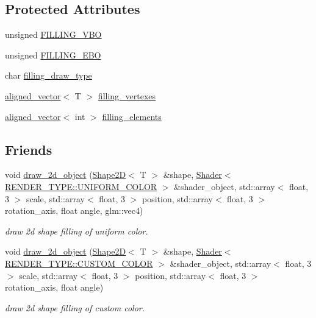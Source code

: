 \subsection*{Protected Attributes}
\begin{DoxyCompactItemize}
\item 
unsigned \mbox{\hyperlink{classShape2D_a220cf4cf96da8bd43627ffffd00a0718}{F\+I\+L\+L\+I\+N\+G\+\_\+\+V\+BO}}
\item 
unsigned \mbox{\hyperlink{classShape2D_affa1082cd6e91cce5af4cb10c1b3435f}{F\+I\+L\+L\+I\+N\+G\+\_\+\+E\+BO}}
\item 
char \mbox{\hyperlink{classShape2D_ab24ceddaa0114eda3ae699f8fb3503ca}{filling\+\_\+draw\+\_\+type}}
\item 
\mbox{\hyperlink{type__definitions_8hpp_a087efd587d66b881646ef378f1919c90}{aligned\+\_\+vector}}$<$ T $>$ \mbox{\hyperlink{classShape2D_ae3e216c9d8422b47f46bff9259bd17be}{filling\+\_\+vertexes}}
\item 
\mbox{\hyperlink{type__definitions_8hpp_a087efd587d66b881646ef378f1919c90}{aligned\+\_\+vector}}$<$ int $>$ \mbox{\hyperlink{classShape2D_a28d0d6018cb6b73637050d9f3fb1f006}{filling\+\_\+elements}}
\end{DoxyCompactItemize}
\subsection*{Friends}
\begin{DoxyCompactItemize}
\item 
void \mbox{\hyperlink{classShape2D_a75ed525e537ded17d42e3adad87bd701}{draw\+\_\+2d\+\_\+object}} (\mbox{\hyperlink{classShape2D}{Shape2D}}$<$ T $>$ \&shape, \mbox{\hyperlink{classShader}{Shader}}$<$ \mbox{\hyperlink{shader__class_8hpp_a24e288e18eb7b6e01de7565001fedb60aa98862073f71a928bad5099cc3e1c2ed}{R\+E\+N\+D\+E\+R\+\_\+\+T\+Y\+P\+E\+::\+U\+N\+I\+F\+O\+R\+M\+\_\+\+C\+O\+L\+OR}} $>$ \&shader\+\_\+object, std\+::array$<$ float, 3 $>$ scale, std\+::array$<$ float, 3 $>$ position, std\+::array$<$ float, 3 $>$ rotation\+\_\+axis, float angle, glm\+::vec4)
\begin{DoxyCompactList}\small\item\em draw 2d shape filling of uniform color. \end{DoxyCompactList}\item 
void \mbox{\hyperlink{classShape2D_a7fa5afc784c9357e9ea0106b7e34e277}{draw\+\_\+2d\+\_\+object}} (\mbox{\hyperlink{classShape2D}{Shape2D}}$<$ T $>$ \&shape, \mbox{\hyperlink{classShader}{Shader}}$<$ \mbox{\hyperlink{shader__class_8hpp_a24e288e18eb7b6e01de7565001fedb60a9d34355b5a26c54b5dbab1e45245a6f4}{R\+E\+N\+D\+E\+R\+\_\+\+T\+Y\+P\+E\+::\+C\+U\+S\+T\+O\+M\+\_\+\+C\+O\+L\+OR}} $>$ \&shader\+\_\+object, std\+::array$<$ float, 3 $>$ scale, std\+::array$<$ float, 3 $>$ position, std\+::array$<$ float, 3 $>$ rotation\+\_\+axis, float angle)
\begin{DoxyCompactList}\small\item\em draw 2d shape filling of custom color. \end{DoxyCompactList}\end{DoxyCompactItemize}



